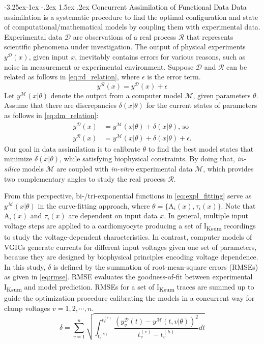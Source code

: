 \documentclass[11pt]{article}
\makeatletter
\renewcommand\subsection{\@startsection{subsection}{2}{\z@}%
                                     {-3.25ex\@plus -1ex \@minus -.2ex}%
                                     {1.5ex \@plus .2ex}%
                                     {\normalfont\fontfamily{phv}\fontsize{14}{17}\bfseries}}
\makeatother
\begin{document}
\subsection{Concurrent Assimilation of Functional Data}
Data assimilation is a systematic procedure to find the optimal configuration and state of computational/mathematical models by coupling them with experimental data. Experimental data $\mathcal{D}$ are observations of a real process $\mathcal{R}$ that represents scientific phenomena under investigation. The output of physical experiments $y^{\mathcal{D}}(x)$, given input $x$, inevitably contains errors for various reasons, such as noise in measurement or experimental environment. Suppose $\mathcal{D}$ and $\mathcal{R}$ can be related as follows in \eqref{eq:rd_relation}, where $\epsilon$ is the error term. 
\begin{equation}
    \label{eq:rd_relation}
    y^{\mathcal{R}}(x) = y^{\mathcal{D}}(x) + \epsilon
\end{equation}
Let $y^{\mathcal{M}}(x|\theta)$ denote the output from a computer model $\mathcal{M}$, given parameters $\theta$. Assume that there are discrepancies $\delta(x|\theta)$ for the current states of parameters as follows in \eqref{eq:dm_relation}:
\begin{align}
    \label{eq:dm_relation}
    y^{\mathcal{D}}(x) &= y^{\mathcal{M}}(x|\theta) + \delta(x|\theta) \text{, so} \\
    y^{\mathcal{R}}(x) &= y^{\mathcal{M}}(x|\theta) + \delta(x|\theta) + \epsilon.
\end{align}
Our goal in data assimilation is to calibrate $\theta$ to find the best model states that minimize $\delta(x|\theta)$, while satisfying biophysical constraints. By doing that, \textit{in-silico} models $\mathcal{M}$ are coupled with \textit{in-vitro} experimental data $\mathcal{M}$, which provides two complementary angles to study the real process $\mathcal{R}$.

From this perspective, bi-/tri-exponential functions in \eqref{eq:expl_fitting} serve as $y^{\mathcal{M}}(x|\theta)$ in the curve-fitting approach, where $\theta=\{\mathrm{A}_{i}(x),\tau_{i}(x)\}$. Note that $\mathrm{A}_{i}(x)$ and $\tau_{i}(x)$ are dependent on input data $x$. In general, multiple input voltage steps are applied to a cardiomyocyte producing a set of I\textsubscript{Ksum} recordings to study the voltage-dependent characteristics. In contrast, computer models of VGICs generate currents for different input voltages given one set of parameters, because they are designed by biophysical principles encoding voltage dependence. In this study, $\delta$ is defined by the summation of root-mean-square errors (RMSEs) as given in \eqref{eq:rmse}. RMSE evaluates the goodness-of-fit between experimental I\textsubscript{Ksum} and model prediction. RMSEs for a set of I\textsubscript{Ksum} traces are summed up to guide the optimization procedure calibrating the models in a concurrent way for clamp voltages $v=1,2,\cdots,n$.
\begin{equation}
    \label{eq:rmse}
    \delta = \sum_{v=1}^{n} \sqrt{\int_{t_v^{(h)}}^{t_v^{(e)}}\frac{(y_v^{\mathcal{D}}(t) - y^{\mathcal{M}}(t,v|\theta))^2}{t_v^{(e)}-t_v^{(h)}}dt}
\end{equation}
\end{document}
